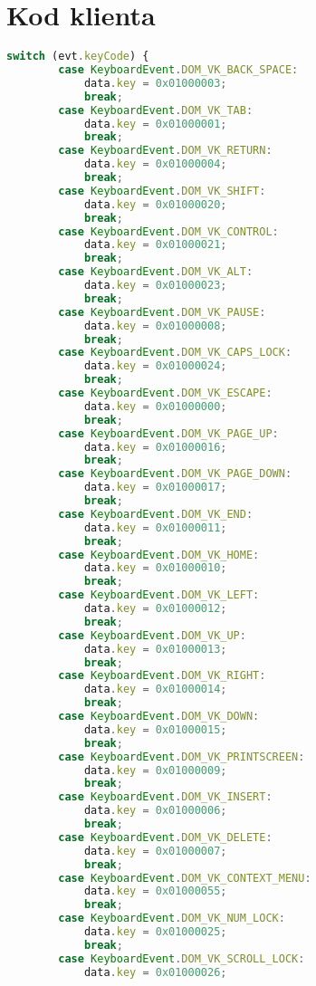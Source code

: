 \section{Kod klienta}

\label{lst:addons_keyboard_method}
\begin{lstlisting}[language=JavaScript,numbers=none,caption=Fragment metody translacji kodów klawiatury]
    switch (evt.keyCode) {
        case KeyboardEvent.DOM_VK_BACK_SPACE:
            data.key = 0x01000003;
            break;
        case KeyboardEvent.DOM_VK_TAB:
            data.key = 0x01000001;
            break;
        case KeyboardEvent.DOM_VK_RETURN:
            data.key = 0x01000004;
            break;
        case KeyboardEvent.DOM_VK_SHIFT:
            data.key = 0x01000020;
            break;
        case KeyboardEvent.DOM_VK_CONTROL:
            data.key = 0x01000021;
            break;
        case KeyboardEvent.DOM_VK_ALT:
            data.key = 0x01000023;
            break;
        case KeyboardEvent.DOM_VK_PAUSE:
            data.key = 0x01000008;
            break;
        case KeyboardEvent.DOM_VK_CAPS_LOCK:
            data.key = 0x01000024;
            break;
        case KeyboardEvent.DOM_VK_ESCAPE:
            data.key = 0x01000000;
            break;
        case KeyboardEvent.DOM_VK_PAGE_UP:
            data.key = 0x01000016;
            break;
        case KeyboardEvent.DOM_VK_PAGE_DOWN:
            data.key = 0x01000017;
            break;
        case KeyboardEvent.DOM_VK_END:
            data.key = 0x01000011;
            break;
        case KeyboardEvent.DOM_VK_HOME:
            data.key = 0x01000010;
            break;
        case KeyboardEvent.DOM_VK_LEFT:
            data.key = 0x01000012;
            break;
        case KeyboardEvent.DOM_VK_UP:
            data.key = 0x01000013;
            break;
        case KeyboardEvent.DOM_VK_RIGHT:
            data.key = 0x01000014;
            break;
        case KeyboardEvent.DOM_VK_DOWN:
            data.key = 0x01000015;
            break;
        case KeyboardEvent.DOM_VK_PRINTSCREEN:
            data.key = 0x01000009;
            break;
        case KeyboardEvent.DOM_VK_INSERT:
            data.key = 0x01000006;
            break;
        case KeyboardEvent.DOM_VK_DELETE:
            data.key = 0x01000007;
            break;
        case KeyboardEvent.DOM_VK_CONTEXT_MENU:
            data.key = 0x01000055;
            break;
        case KeyboardEvent.DOM_VK_NUM_LOCK:
            data.key = 0x01000025;
            break;
        case KeyboardEvent.DOM_VK_SCROLL_LOCK:
            data.key = 0x01000026;

\end{lstlisting}
